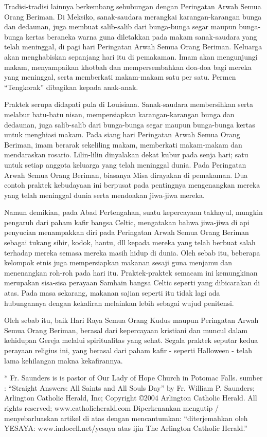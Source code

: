 Tradisi-tradisi lainnya berkembang sehubungan dengan Peringatan Arwah Semua Orang Beriman. Di Meksiko, sanak-saudara merangkai karangan-karangan bunga dan dedaunan, juga membuat salib-salib dari bunga-bunga segar maupun bunga-bunga kertas beraneka warna guna diletakkan pada makam sanak-saudara yang telah meninggal, di pagi hari Peringatan Arwah Semua Orang Beriman. Keluarga akan menghabiskan sepanjang hari itu di pemakaman. Imam akan mengunjungi makam, menyampaikan khotbah dan mempersembahkan doa-doa bagi mereka yang meninggal, serta memberkati makam-makam satu per satu. Permen “Tengkorak” dibagikan kepada anak-anak.

Praktek serupa didapati pula di Louisiana. Sanak-saudara membersihkan serta melabur batu-batu nisan, mempersiapkan karangan-karangan bunga dan dedaunan, juga salib-salib dari bunga-bunga segar maupun bunga-bunga kertas untuk menghiasi makam. Pada siang hari Peringatan Arwah Semua Orang Beriman, imam berarak sekeliling makam, memberkati makam-makam dan mendaraskan rosario. Lilin-lilin dinyalakan dekat kubur pada senja hari; satu untuk setiap anggota keluarga yang telah meninggal dunia. Pada Peringatan Arwah Semua Orang Beriman, biasanya Misa dirayakan di pemakaman. Dua contoh praktek kebudayaan ini berpusat pada pentingnya mengenangkan mereka yang telah meninggal dunia serta mendoakan jiwa-jiwa mereka.

Namun demikian, pada Abad Pertengahan, suatu kepercayaan takhayul, mungkin pengaruh dari paham kafir bangsa Celtic, mengatakan bahwa jiwa-jiwa di api penyucian menampakkan diri pada Peringatan Arwah Semua Orang Beriman sebagai tukang sihir, kodok, hantu, dll kepada mereka yang telah berbuat salah terhadap mereka semasa mereka masih hidup di dunia. Oleh sebab itu, beberapa kelompok etnis juga mempersiapkan makanan sesaji guna menjamu dan menenangkan roh-roh pada hari itu. Praktek-praktek semacam ini kemungkinan merupakan sisa-sisa perayaan Samhain bangsa Celtic seperti yang dibicarakan di atas. Pada masa sekarang, makanan sajian seperti itu tidak lagi ada hubungannya dengan kekafiran melainkan lebih sebagai wujud penitensi.  

Oleh sebab itu, baik Hari Raya Semua Orang Kudus maupun Peringatan Arwah Semua Orang Beriman, berasal dari kepercayaan kristiani dan muncul dalam kehidupan Gereja melalui spiritualitas yang sehat. Segala praktek seputar kedua perayaan religius ini, yang berasal dari paham kafir - seperti Halloween - telah lama kehilangan makna kekafirannya.


* Fr. Saunders is is pastor of Our Lady of Hope Church in Potomac Falls.
sumber : “Straight Answers: All Saints and All Souls Day” by Fr. William P. Saunders; Arlington Catholic Herald, Inc; Copyright ©2004 Arlington Catholic Herald. All rights reserved; www.catholicherald.com
Diperkenankan mengutip / menyebarluaskan artikel di atas dengan mencantumkan: “diterjemahkan oleh YESAYA: www.indocell.net/yesaya atas ijin The Arlington Catholic Herald.”
	
	                                                                                                                                                                                                                                                                                                            	